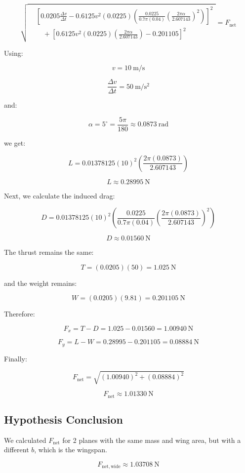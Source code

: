 \documentclass[12pt]{article}
\begin{document}
\[
\sqrt{
\begin{aligned}
&
\left[
0.0205\frac{\Delta v}{\Delta t}
-
0.6125v^2(0.0225)
\left(
\frac{0.0225}{0.7\pi(0.04)}
\left(
\frac{2\pi\alpha}{2.607143}
\right)^2
\right)
\right]^2
\\[2mm]
&\quad+
\left[
0.6125v^2(0.0225)
\left(
\frac{2\pi\alpha}{2.607143}
\right)
-0.201105
\right]^2
\end{aligned}
}
= F_{\mathrm{net}}
\]

Using:

\[
v=10\ \mathrm{m/s}
\]

\[
\frac{\Delta v}{\Delta t}=50\ \mathrm{m/s^2}
\]

and:

\[
\alpha=5^\circ
=
\frac{5\pi}{180}
\approx0.0873\ \mathrm{rad}
\]

we get:

\[
L=
0.01378125(10)^2
\left(
\frac{2\pi(0.0873)}{2.607143}
\right)
\]

\[
L\approx0.28995\ \mathrm{N}
\]

Next, we calculate the induced drag:

\[
D=
0.01378125(10)^2
\left(
\frac{0.0225}{0.7\pi(0.04)}
\left(
\frac{2\pi(0.0873)}{2.607143}
\right)^2
\right)
\]

\[
D\approx0.01560\ \mathrm{N}
\]

The thrust remains the same:

\[
T=(0.0205)(50)=1.025\ \mathrm{N}
\]

and the weight remains:

\[
W=(0.0205)(9.81)=0.201105\ \mathrm{N}
\]

Therefore:

\[
F_x=T-D
=
1.025-0.01560
=
1.00940\ \mathrm{N}
\]

\[
F_y=L-W
=
0.28995-0.201105
=
0.08884\ \mathrm{N}
\]

Finally:

\[
F_{\mathrm{net}}
=
\sqrt{(1.00940)^2+(0.08884)^2}
\]

\[
F_{\mathrm{net}}\approx1.01330\ \mathrm{N}
\]

\subsection{Hypothesis Conclusion}

We calculated $F_{\mathrm{net}}$ for 2 planes with the same mass and wing area, but with a different $b$, which is the wingspan.

\[
F_{\mathrm{net,wide}}\approx1.03708\ \mathrm N
\]
\end{document}
